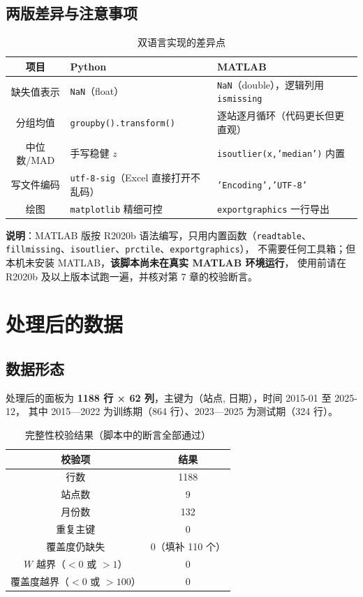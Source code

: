 \documentclass[11pt,a4paper]{ctexart}
\begin{document}
\subsection{两版差异与注意事项}

\begin{table}[H]\centering\small
\begin{tabularx}{\textwidth}{|c|X|X|}
\toprule
项目 & Python & MATLAB \\
\midrule
缺失值表示 & \texttt{NaN}（float） & \texttt{NaN}（double），逻辑列用 \texttt{ismissing} \\
分组均值 & \texttt{groupby().transform()} & 逐站逐月循环（代码更长但更直观） \\
中位数/MAD & 手写稳健 $z$ & \texttt{isoutlier(x,'median')} 内置 \\
写文件编码 & \texttt{utf-8-sig}（Excel 直接打开不乱码） & \texttt{'Encoding','UTF-8'} \\
绘图 & \texttt{matplotlib} 精细可控 & \texttt{exportgraphics} 一行导出 \\
\bottomrule
\end{tabularx}
\caption{双语言实现的差异点}
\end{table}

\noindent\textbf{说明}：MATLAB 版按 R2020b 语法编写，只用内置函数（\texttt{readtable}、
\texttt{fillmissing}、\texttt{isoutlier}、\texttt{prctile}、\texttt{exportgraphics}），
不需要任何工具箱；但本机未安装 MATLAB，\textbf{该脚本尚未在真实 MATLAB 环境运行}，
使用前请在 R2020b 及以上版本试跑一遍，并核对第 7 章的校验断言。

\section{处理后的数据}

\subsection{数据形态}

处理后的面板为 \textbf{1188 行 × 62 列}，主键为（站点, 日期），时间 2015-01 至 2025-12，
其中 2015—2022 为训练期（864 行）、2023—2025 为测试期（324 行）。

\begin{table}[H]\centering\small
\begin{tabular}{|c|c|}
\toprule
校验项 & 结果 \\
\midrule
行数 & 1188 \\
站点数 & 9 \\
月份数 & 132 \\
重复主键 & 0 \\
覆盖度仍缺失 & 0（填补 110 个） \\
$W$ 越界（$<0$ 或 $>1$） & 0 \\
覆盖度越界（$<0$ 或 $>100$） & 0 \\
\bottomrule
\end{tabular}
\caption{完整性校验结果（脚本中的断言全部通过）}
\end{table}
\end{document}
